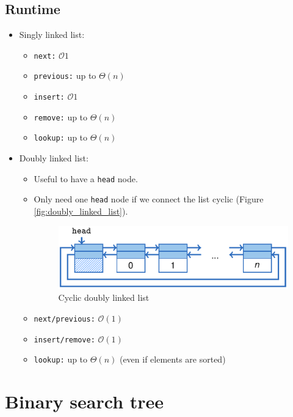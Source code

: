 \documentclass[12pt, a4paper]{scrartcl}
\newcommand{\bigO}{\mathcal{O}}
\newcommand{\imgwidth}{.7\textwidth}
\begin{document}
\subsection{Runtime}
\begin{itemize}
\item Singly linked list:
  \begin{itemize}
  \item \texttt{next:} $\bigO{1} $
  \item \texttt{previous:} up to $\Theta(n)$
  \item \texttt{insert:} $\bigO{1}$
  \item \texttt{remove:} up to $\Theta(n)$
  \item \texttt{lookup:} up to $\Theta(n)$
  \end{itemize}
\item Doubly linked list:
  \begin{itemize}
  \item Useful to have a \texttt{head} node.
  \item Only need one \texttt{head} node if we connect the list cyclic (Figure \ref{fig:doubly_linked_list}).
    \begin{figure}[htbp]
      \centering
      \includegraphics[width=\imgwidth]{cyclic_doubly_linked}
      \caption{Cyclic doubly linked list}
      \label{fig:cyclic_doubly_linked}
    \end{figure}
  \item \texttt{next/previous:} $\bigO(1)$
  \item \texttt{insert/remove:} $\bigO(1)$
  \item \texttt{lookup:} up to $\Theta(n)$ (even if elements are sorted)
  \end{itemize}
\end{itemize}

\section{Binary search tree}
\label{sec:binary_search_tree}
\end{document}

